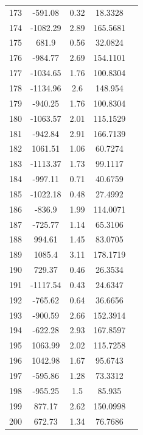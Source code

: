 {\begin{longtable}{ccccc}
173 & -591.08 & 0.32 & 18.3328 \\ 
174 & -1082.29 & 2.89 & 165.5681 \\ 
175 & 681.9 & 0.56 & 32.0824 \\ 
176 & -984.77 & 2.69 & 154.1101 \\ 
177 & -1034.65 & 1.76 & 100.8304 \\ 
178 & -1134.96 & 2.6 & 148.954 \\ 
179 & -940.25 & 1.76 & 100.8304 \\ 
180 & -1063.57 & 2.01 & 115.1529 \\ 
181 & -942.84 & 2.91 & 166.7139 \\ 
182 & 1061.51 & 1.06 & 60.7274 \\ 
183 & -1113.37 & 1.73 & 99.1117 \\ 
184 & -997.11 & 0.71 & 40.6759 \\ 
185 & -1022.18 & 0.48 & 27.4992 \\ 
186 & -836.9 & 1.99 & 114.0071 \\ 
187 & -725.77 & 1.14 & 65.3106 \\ 
188 & 994.61 & 1.45 & 83.0705 \\ 
189 & 1085.4 & 3.11 & 178.1719 \\ 
190 & 729.37 & 0.46 & 26.3534 \\ 
191 & -1117.54 & 0.43 & 24.6347 \\ 
192 & -765.62 & 0.64 & 36.6656 \\ 
193 & -900.59 & 2.66 & 152.3914 \\ 
194 & -622.28 & 2.93 & 167.8597 \\ 
195 & 1063.99 & 2.02 & 115.7258 \\ 
196 & 1042.98 & 1.67 & 95.6743 \\ 
197 & -595.86 & 1.28 & 73.3312 \\ 
198 & -955.25 & 1.5 & 85.935 \\ 
199 & 877.17 & 2.62 & 150.0998 \\ 
200 & 672.73 & 1.34 & 76.7686 \\ \hline
\end{longtable}
}


